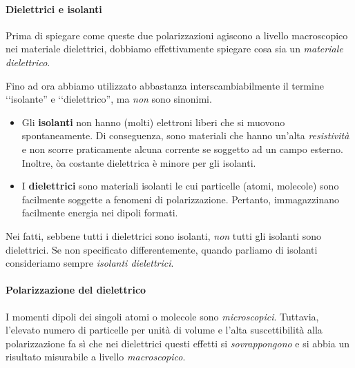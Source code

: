 \paragraph{Dielettrici e isolanti}\label{defdielettrico}
Prima di spiegare come queste due polarizzazioni agiscono a livello macroscopico nei materiale dielettrici, dobbiamo effettivamente spiegare cosa sia un \textit{materiale dielettrico}.

Fino ad ora abbiamo utilizzato abbastanza interscambiabilmente il termine ‘‘isolante'' e ‘‘dielettrico'', ma \textit{non} sono sinonimi.
\begin{itemize}
	\item Gli \textbf{isolanti} non hanno (molti) elettroni liberi che si muovono spontaneamente. Di conseguenza, sono materiali che hanno un'alta \textit{resistività} e non scorre praticamente alcuna corrente se soggetto ad un campo esterno. Inoltre, òa costante dielettrica è minore per gli isolanti.
	\item I \textbf{dielettrici} sono materiali isolanti le cui particelle (atomi, molecole) sono facilmente soggette a fenomeni di polarizzazione. Pertanto, immagazzinano facilmente energia nei dipoli formati.
\end{itemize}
Nei fatti, sebbene tutti i dielettrici sono isolanti, \textit{non} tutti gli isolanti sono dielettrici. Se non specificato differentemente, quando parliamo di isolanti consideriamo sempre \textit{isolanti dielettrici}.
\paragraph{Polarizzazione del dielettrico}
I momenti dipoli dei singoli atomi o molecole sono \textit{microscopici}. Tuttavia, l'elevato numero di particelle per unità di volume e l'alta suscettibilità alla polarizzazione fa sì che nei dielettrici questi effetti si \textit{sovrappongono} e si abbia un risultato misurabile a livello \textit{macroscopico}.

